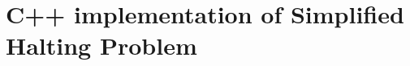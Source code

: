 \documentclass[12pt]{article}
\begin{document}



\appendix

\section{C++ implementation of Simplified Halting Problem}\label{app:impl}

\end{document}
